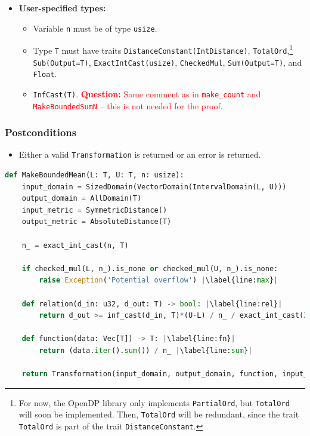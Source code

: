 \documentclass[11pt,a4paper]{article}
\theoremstyle{definition}
\newcommand{\questionc}[1]{\textcolor{red}{\textbf{Question:} #1}}
\begin{document}
\begin{itemize}
    \item \textbf{User-specified types:}
    \begin{itemize}
        \item Variable \texttt{n} must be of type \texttt{usize}.
        \item Type \texttt{T} must have traits \texttt{DistanceConstant(IntDistance)}, \texttt{TotalOrd},\footnote{For now, the OpenDP library only implements \texttt{PartialOrd}, but \texttt{TotalOrd} will soon be implemented. Then, \texttt{TotalOrd} will be redundant, since the trait \texttt{TotalOrd} is part of the trait \texttt{DistanceConstant}.} \texttt{Sub(Output=T)}, \texttt{ExactIntCast(usize)}, \texttt{CheckedMul}, \texttt{Sum(Output=T)}, and \texttt{Float}. 
        \item \texttt{InfCast(T)}. \questionc{Same comment as in \texttt{make\_count} and \texttt{MakeBoundedSumN} -- this is not needed for the proof.}
    \end{itemize}
\end{itemize}

\subsubsection*{Postconditions}
\begin{itemize}
    \item Either a valid \texttt{Transformation} is returned or an error is returned.
\end{itemize}

\begin{lstlisting}[language=Python, escapechar=|]
def MakeBoundedMean(L: T, U: T, n: usize):
    input_domain = SizedDomain(VectorDomain(IntervalDomain(L, U)))
    output_domain = AllDomain(T)
    input_metric = SymmetricDistance()
    output_metric = AbsoluteDistance(T)
    
    n_ = exact_int_cast(n, T)
    
    if checked_mul(L, n_).is_none or checked_mul(U, n_).is_none: 
        raise Exception('Potential overflow') |\label{line:max}|
    
    def relation(d_in: u32, d_out: T) -> bool: |\label{line:rel}|
        return d_out >= inf_cast(d_in, T)*(U-L) / n_ / exact_int_cast(2, T)
    
    def function(data: Vec[T]) -> T: |\label{line:fn}|
        return (data.iter().sum()) / n_ |\label{line:sum}|
    
    return Transformation(input_domain, output_domain, function, input_metric, output_metric, stability_relation = relation)
\end{lstlisting}
\end{document}
